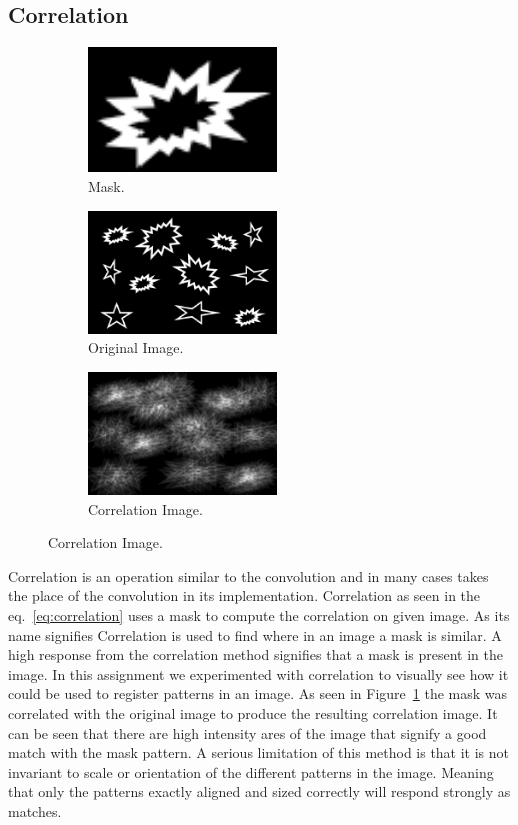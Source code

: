 \documentclass[letterpaper,10pt]{article}
\begin{document}
\subsection{Correlation}
\begin{figure}[hbtp]
  \centering
  \begin{subfigure}{5cm}
    \includegraphics[width=5cm]{images/Pattern.png}
    \caption{Mask.}
  \end{subfigure}
  \begin{subfigure}{5cm}
    \includegraphics[width=5cm]{images/Image.png}
    \caption{Original Image.}
  \end{subfigure}
  \begin{subfigure}{5cm}
    \includegraphics[width=5cm]{images/correlation.png}
    \caption{Correlation Image.}
  \end{subfigure}
  \label{fig:correlation}
\end{figure}

Correlation is an operation similar to the convolution and in many cases takes the place of the convolution in its implementation. Correlation as seen in the eq.~\ref{eq:correlation} uses a mask to compute the correlation on given image. As its name signifies Correlation is used to find where in an image a mask is similar. A high response from the correlation method signifies that a mask is present in the image. In this assignment we experimented with correlation to visually see how it could be used to register patterns in an image. As seen in Figure~\ref{fig:correlation} the mask was correlated with the original image to produce the resulting correlation image. It can be seen that there are high intensity ares of the image that signify a good match with the mask pattern. A serious limitation of this method is that it is not invariant to scale or orientation of the different patterns in the image. Meaning that only the patterns exactly aligned and sized correctly will respond strongly as matches.
\end{document}
